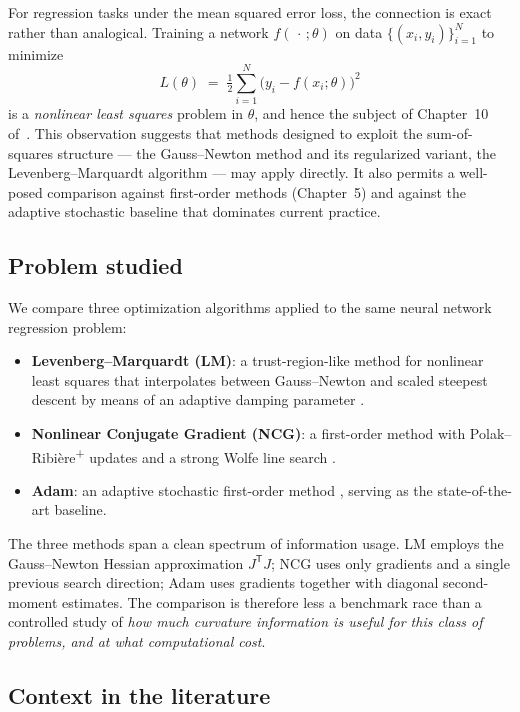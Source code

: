 \documentclass[11pt,letterpaper]{article}
\newcommand{\T}{^{\mathsf{T}}}
\theoremstyle{definition}
\begin{document}
For regression tasks under the mean squared error loss, the connection is
exact rather than analogical. Training a network $f(\,\cdot\,;\theta)$ on
data $\{(x_i, y_i)\}_{i=1}^N$ to minimize
\begin{equation}
L(\theta)
\;=\; \tfrac{1}{2}\sum_{i=1}^{N}\bigl(y_i - f(x_i;\theta)\bigr)^{2}
\label{eq:loss-intro}
\end{equation}
is a \emph{nonlinear least squares} problem in $\theta$, and hence the subject
of Chapter~10 of~\citet{NocedalWright2006}. This observation suggests that
methods designed to exploit the sum-of-squares structure --- the
Gauss--Newton method and its regularized variant, the Levenberg--Marquardt
algorithm --- may apply directly. It also permits a well-posed comparison
against first-order methods (Chapter~5) and against the adaptive
stochastic baseline that dominates current practice.
 
\subsection{Problem studied}
 
We compare three optimization algorithms applied to the same neural network
regression problem:
\begin{itemize}
  \item \textbf{Levenberg--Marquardt (LM)}: a trust-region-like method for
    nonlinear least squares that interpolates between Gauss--Newton and
    scaled steepest descent by means of an adaptive damping parameter
    \citep[Ch.~10]{NocedalWright2006}.
  \item \textbf{Nonlinear Conjugate Gradient (NCG)}: a first-order method
    with Polak--Ribière\textsuperscript{+} updates and a strong Wolfe line
    search \citep[Ch.~5]{NocedalWright2006}.
  \item \textbf{Adam}: an adaptive stochastic first-order method
    \citep{KingmaBa2015}, serving as the state-of-the-art baseline.
\end{itemize}
The three methods span a clean spectrum of information usage. LM employs
the Gauss--Newton Hessian approximation $J\T J$; NCG uses only gradients and
a single previous search direction; Adam uses gradients together with
diagonal second-moment estimates. The comparison is therefore less a
benchmark race than a controlled study of \emph{how much curvature
information is useful for this class of problems, and at what computational
cost}.
 
\subsection{Context in the literature}
 
\end{document}
